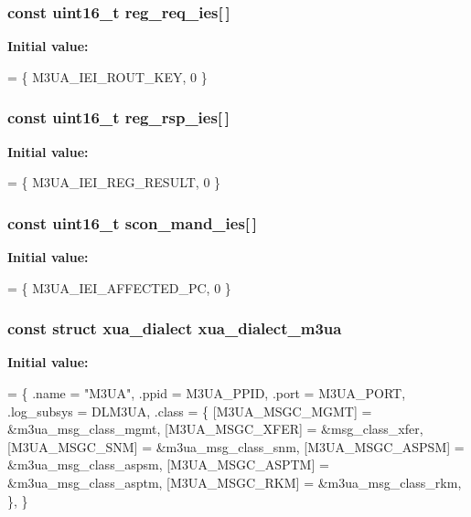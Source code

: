 \subsubsection[{reg\+\_\+req\+\_\+ies}]{\setlength{\rightskip}{0pt plus 5cm}const uint16\+\_\+t reg\+\_\+req\+\_\+ies[$\,$]\hspace{0.3cm}{\ttfamily [static]}}\label{m3ua_8c_a7866fdd10f679afcc6e42d10c59ffcf7}
{\bfseries Initial value\+:}
\begin{DoxyCode}
= \{
        M3UA_IEI_ROUT_KEY, 0
\}
\end{DoxyCode}
\subsubsection[{reg\+\_\+rsp\+\_\+ies}]{\setlength{\rightskip}{0pt plus 5cm}const uint16\+\_\+t reg\+\_\+rsp\+\_\+ies[$\,$]\hspace{0.3cm}{\ttfamily [static]}}\label{m3ua_8c_ad2f30e4680b32979455a6b68718f00f1}
{\bfseries Initial value\+:}
\begin{DoxyCode}
= \{
        M3UA_IEI_REG_RESULT, 0
\}
\end{DoxyCode}
\subsubsection[{scon\+\_\+mand\+\_\+ies}]{\setlength{\rightskip}{0pt plus 5cm}const uint16\+\_\+t scon\+\_\+mand\+\_\+ies[$\,$]\hspace{0.3cm}{\ttfamily [static]}}\label{m3ua_8c_a09664928650382f05db82d15791cd264}
{\bfseries Initial value\+:}
\begin{DoxyCode}
= \{
        M3UA_IEI_AFFECTED_PC, 0
\}
\end{DoxyCode}
\subsubsection[{xua\+\_\+dialect\+\_\+m3ua}]{\setlength{\rightskip}{0pt plus 5cm}const struct {\bf xua\+\_\+dialect} xua\+\_\+dialect\+\_\+m3ua}\label{m3ua_8c_a14e3c740216dbf27160e15377d4dbd43}
{\bfseries Initial value\+:}
\begin{DoxyCode}
= \{
        .name = \textcolor{stringliteral}{"M3UA"},
        .ppid = M3UA_PPID,
        .port = M3UA_PORT,
        .log\_subsys = DLM3UA,
        .class = \{
                [M3UA_MSGC_MGMT] = &m3ua_msg_class_mgmt,
                [M3UA_MSGC_XFER] = &msg_class_xfer,
                [M3UA_MSGC_SNM] = &m3ua_msg_class_snm,
                [M3UA_MSGC_ASPSM] = &m3ua_msg_class_aspsm,
                [M3UA_MSGC_ASPTM] = &m3ua_msg_class_asptm,
                [M3UA_MSGC_RKM] = &m3ua_msg_class_rkm,
        \},
\}
\end{DoxyCode}
